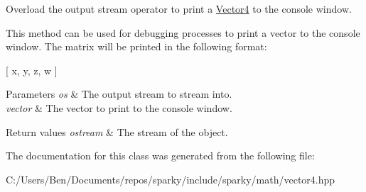 Overload the output stream operator to print a \hyperlink{classsparky_1_1_vector4}{Vector4} to the console window. 

This method can be used for debugging processes to print a vector to the console window. The matrix will be printed in the following format\+:

\mbox{[} x, y, z, w \mbox{]}


\begin{DoxyParams}{Parameters}
{\em os} & The output stream to stream into. \\
\hline
{\em vector} & The vector to print to the console window.\\
\hline
\end{DoxyParams}

\begin{DoxyRetVals}{Return values}
{\em ostream} & The stream of the object. \\
\hline
\end{DoxyRetVals}


The documentation for this class was generated from the following file\+:\begin{DoxyCompactItemize}
\item 
C\+:/\+Users/\+Ben/\+Documents/repos/sparky/include/sparky/math/vector4.\+hpp\end{DoxyCompactItemize}
